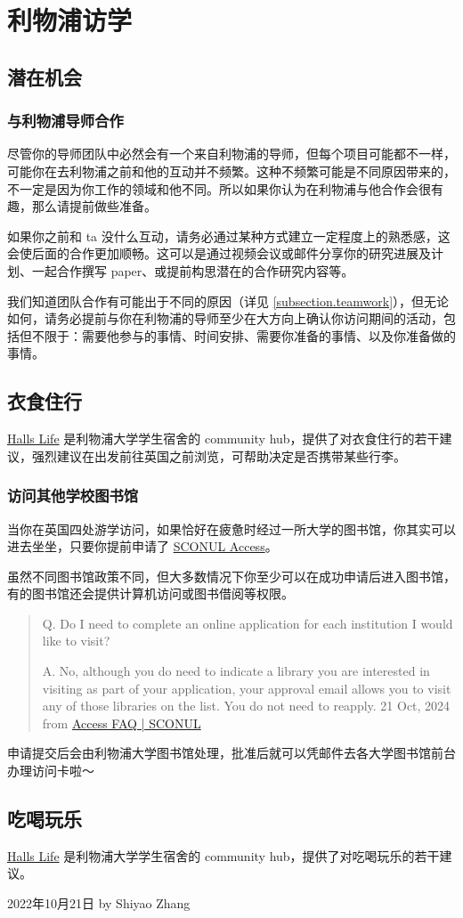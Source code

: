 \section{利物浦访学}

\subsection{潜在机会}
\subsubsection{与利物浦导师合作}
尽管你的导师团队中必然会有一个来自利物浦的导师，但每个项目可能都不一样，可能你在去利物浦之前和他的互动并不频繁。这种不频繁可能是不同原因带来的，不一定是因为你工作的领域和他不同。所以如果你认为在利物浦与他合作会很有趣，那么请提前做些准备。

如果你之前和 ta 没什么互动，请务必通过某种方式建立一定程度上的熟悉感，这会使后面的合作更加顺畅。这可以是通过视频会议或邮件分享你的研究进展及计划、一起合作撰写 paper、或提前构思潜在的合作研究内容等。

我们知道团队合作有可能出于不同的原因（详见 \ref{subsection.teamwork}），但无论如何，请务必提前与你在利物浦的导师至少在大方向上确认你访问期间的活动，包括但不限于：需要他参与的事情、时间安排、需要你准备的事情、以及你准备做的事情。


\subsection{衣食住行}
\href{https://hallslife.liverpool.ac.uk}{Halls Life} 是利物浦大学学生宿舍的 community hub，提供了对衣食住行的若干建议，强烈建议在出发前往英国之前浏览，可帮助决定是否携带某些行李。

\subsubsection{访问其他学校图书馆}
当你在英国四处游学访问，如果恰好在疲惫时经过一所大学的图书馆，你其实可以进去坐坐，只要你提前申请了 \href{https://access.sconul.ac.uk/sconul-access}{SCONUL Access}。

虽然不同图书馆政策不同，但大多数情况下你至少可以在成功申请后进入图书馆，有的图书馆还会提供计算机访问或图书借阅等权限。

\begin{quote}
    Q. Do I need to complete an online application for each institution I would like to visit?
    
    A. No, although you do need to indicate a library you are interested in visiting as part of your application, your approval email allows you to visit any of those libraries on the list. You do not need to reapply. \hfill 21 Oct, 2024 from \href{https://access.sconul.ac.uk/page/access-faq#Multiple%20applications}{Access FAQ | SCONUL}
\end{quote}

申请提交后会由利物浦大学图书馆处理，批准后就可以凭邮件去各大学图书馆前台办理访问卡啦～


\subsection{吃喝玩乐}
\href{https://hallslife.liverpool.ac.uk}{Halls Life} 是利物浦大学学生宿舍的 community hub，提供了对吃喝玩乐的若干建议。

\begin{flushright}
    2022年10月21日 by Shiyao Zhang
\end{flushright}